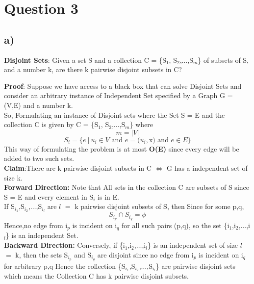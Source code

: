 \documentclass{report}
\begin{document}
 \section*{Question 3}
 \subsection*{a)}
 \textbf{Disjoint Sets}: Given a set S and a collection C = \{S$_1$, S$_2$,$\dots$,S$_m$\} of subsets of S, and a number k, are there k pairwise disjoint subsets in C?\vspace*{1em}\\
 \textbf{Proof}: Suppose we have access to a black box that can solve Disjoint Sets and consider an arbitrary instance of Independent Set specified by a Graph G = (V,E) and a number k.\\
 So, Formulating an instance of Disjoint sets where the Set S = E and the collection C is given by C = \{S$_1$, S$_2$,$\dots$,S$_m$\} where 
 \begin{equation*}
     m = |V|
 \end{equation*}
 \begin{equation*}
     S_i = \{e\ |\ u_i \in V \text{ and }e = (u_i,\text{x) and } e \in E \}
 \end{equation*}
 This way of formulating the problem is at most \textbf{O(E)} since every edge will be added to two such sets.\\
 \textbf{Claim}:There are k pairwise disjoint subsets in C $\iff$ G has a independent set of size k.\vspace*{0.5em}\\
 \textbf{Forward Direction:} Note that All sets in the collection C are subsets of S since S = E and every element in S$_i$ is in E.\\
 If S$_{i_1}$,S$_{i_2}$,$\dots$,S$_{i_l}$ are $l$ $=$ k pairwise disjoint subsets of S, then Since for some p,q,
 \begin{equation*}
     S_{i_p} \cap S_{i_q} = \phi
 \end{equation*}
 Hence,no edge from i$_p$ is incident on i$_q$ for all such pairs (p,q), so the set \{i$_1$,i$_2$,$\dots$,i$_l$\} is an independent Set.\vspace*{0.2em}\\
 \textbf{Backward Direction:} Conversely, if \{i$_1$,i$_2$,$\dots$,i$_l$\} is an independent set of size $l$ $=$ k, then the sets S$_{i_p}$ and S$_{i_q}$ are disjoint since no edge from i$_p$ is incident on i$_q$ for arbitrary p,q Hence the collection \{S$_{i_1}$,S$_{i_2}$,$\dots$,S$_{i_l}$\} are pairwise disjoint sets which means the Collection C has k pairwise disjoint subsets.
\end{document}
